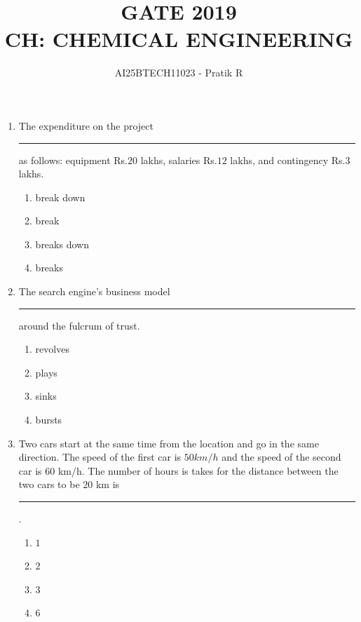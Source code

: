 \documentclass[journal,12pt,onecolumn]{IEEEtran}
\theoremstyle{remark}
\begin{document}
\title{
GATE 2019 \\
CH: CHEMICAL ENGINEERING}
\author{AI25BTECH11023 - Pratik R}
\maketitle
\renewcommand{\thefigure}{\theenumi}

\begin{enumerate}
    \item The expenditure on the project \rule{1cm}{0.1mm} as follows: equipment Rs.$20$ lakhs, salaries Rs.$12$ lakhs, and contingency Rs.$3$ lakhs.
    
    \hfill{}
\begin{multicols}{4}
    \begin{enumerate}
        \item break down
        \item break
        \item breaks down
        \item breaks
    \end{enumerate}
\end{multicols}

    \item The search engine's business model \rule{1.5cm}{0.1mm} around the fulcrum of trust.
    
\hfill{}
\begin{multicols}{4}
    \begin{enumerate}
        \item revolves
        \item plays
        \item sinks
        \item bursts
    \end{enumerate}
\end{multicols}

    \item Two cars start at the same time from the location and go in the same direction. The speed of the first car is $50km/h$ and the speed of the second car is $60$ km/h. The number of hours is takes for the distance between the two cars to be $20$ km is \rule{1cm}{0.1mm}.
    
    \hfill{}
\begin{multicols}{4}
    \begin{enumerate}
        \item $1$
        \item $2$
        \item $3$
        \item $6$
    \end{enumerate}
\end{multicols}


\end{enumerate}
\end{document}

